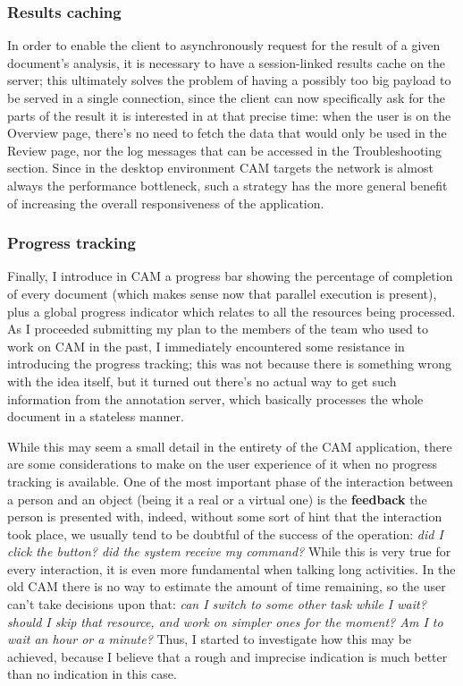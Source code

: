 \documentclass[12pt,oneside,svgnames]{memoir}
\begin{document}
\subsubsection*{Results caching}\label{results-caching}

In order to enable the client to asynchronously request for the result
of a given document's analysis, it is necessary to have a session-linked
results cache on the server; this ultimately solves the problem of
having a possibly too big payload to be served in a single connection,
since the client can now specifically ask for the parts of the result it
is interested in at that precise time: when the user is on the Overview
page, there's no need to fetch the data that would only be used in the
Review page, nor the log messages that can be accessed in the
Troubleshooting section. Since in the desktop environment CAM targets
the network is almost always the performance bottleneck, such a strategy
has the more general benefit of increasing the overall responsiveness of
the application.

\subsubsection*{Progress tracking}\label{progress-tracking}

Finally, I introduce in CAM a progress bar showing the percentage of
completion of every document (which makes sense now that parallel
execution is present), plus a global progress indicator which relates to
all the resources being processed. As I proceeded submitting my plan to
the members of the team who used to work on CAM in the past, I
immediately encountered some resistance in introducing the progress
tracking; this was not because there is something wrong with the idea
itself, but it turned out there's no actual way to get such information
from the annotation server, which basically processes the whole document
in a stateless manner.

While this may seem a small detail in the entirety of the CAM
application, there are some considerations to make on the user
experience of it when no progress tracking is available. One of the most
important phase of the interaction between a person and an object (being
it a real or a virtual one) is the \textbf{feedback} the person is
presented with, indeed, without some sort of hint that the interaction
took place, we usually tend to be doubtful of the success of the
operation: \emph{did I click the button? did the system receive my
command?} While this is very true for every interaction, it is even more
fundamental when talking long activities. In the old CAM there is no way
to estimate the amount of time remaining, so the user can't take
decisions upon that: \emph{can I switch to some other task while I wait?
should I skip that resource, and work on simpler ones for the moment? Am
I to wait an hour or a minute?} Thus, I started to investigate how this
may be achieved, because I believe that a rough and imprecise indication
is much better than no indication in this case.
\end{document}
